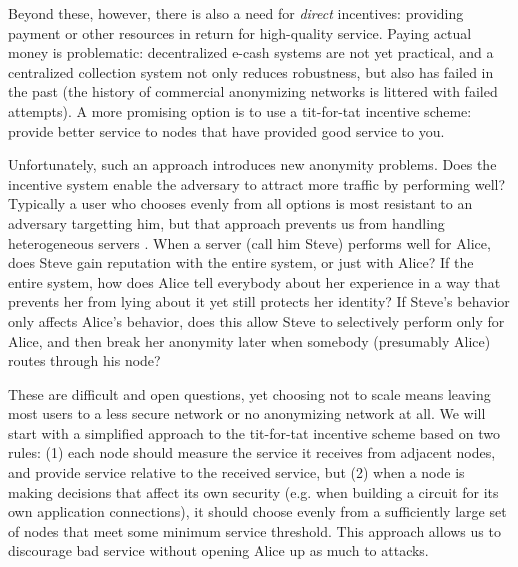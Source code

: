 \documentclass{llncs}
\begin{document}
Beyond these, however, there is also a need for \emph{direct} incentives:
providing payment or other resources in return for high-quality service.
Paying actual money is problematic: decentralized e-cash systems are
not yet practical, and a centralized collection system not only reduces
robustness, but also has failed in the past (the history of commercial
anonymizing networks is littered with failed attempts).  A more promising
option is to use a tit-for-tat incentive scheme: provide better service
to nodes that have provided good service to you.

Unfortunately, such an approach introduces new anonymity problems.
Does the incentive system enable the adversary to attract more traffic by
performing well? Typically a user who chooses evenly from all options is
most resistant to an adversary targetting him, but that approach prevents
us from handling heterogeneous servers \cite{casc-rep}.
When a server (call him Steve) performs well for Alice, does Steve gain
reputation with the entire system, or just with Alice? If the entire
system, how does Alice tell everybody about her experience in a way that
prevents her from lying about it yet still protects her identity? If
Steve's behavior only affects Alice's behavior, does this allow Steve to
selectively perform only for Alice, and then break her anonymity later
when somebody (presumably Alice) routes through his node?

These are difficult and open questions, yet choosing not to scale means
leaving most users to a less secure network or no anonymizing network
at all.  We will start with a simplified approach to the tit-for-tat
incentive scheme based on two rules: (1) each node should measure the
service it receives from adjacent nodes, and provide service relative to
the received service, but (2) when a node is making decisions that affect
its own security (e.g. when building a circuit for its own application
connections), it should choose evenly from a sufficiently large set of
nodes that meet some minimum service threshold.  This approach allows us
to discourage bad service without opening Alice up as much to attacks.


\end{document}
